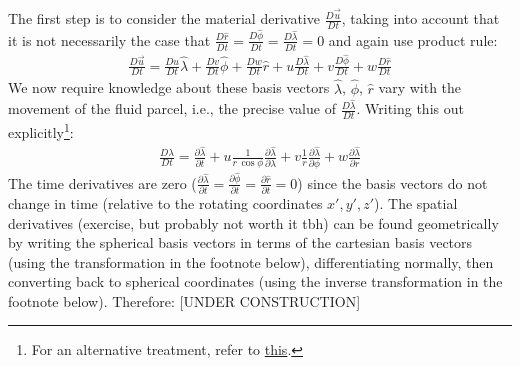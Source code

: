 The first step is to consider the material derivative \(\frac{D\vec{u}}{Dt}\), taking into account that it is not necessarily the case that \(\frac{D\hat{r}}{Dt}=\frac{D\hat{\phi}}{Dt}=\frac{D\hat{\lambda}}{Dt}=0\) and again use product rule:
\begin{align*}
    \frac{D\vec{u}}{Dt} = 
    \frac{Du}{Dt}\hat{\lambda} +
    \frac{Dv}{Dt}\hat{\phi} +
    \frac{Dw}{Dt}\hat{r} +
    u\frac{D\hat{\lambda}}{Dt} +
    v\frac{D\hat{\phi}}{Dt} +
    w\frac{D\hat{r}}{Dt}
\end{align*}
We now require knowledge about these basis vectors \(\hat{\lambda}\), \(\hat{\phi}\), \(\hat{r}\) vary with the movement of the fluid parcel, i.e., the precise value of \(\frac{D\hat{\lambda}}{Dt}\). Writing this out explicitly\footnote{For an alternative treatment, refer to \href{https://farside.ph.utexas.edu/teaching/336L/Fluidhtml/node258.html}{this}.}:
\begin{align*}
    \frac{D\hat{\lambda}}{Dt}
    =
    \frac{\partial \hat{\lambda}}{\partial t}
    +
    u\frac{1}{r\,\cos\phi}\frac{\partial \hat{\lambda}}{\partial \lambda}
    +
    v\frac{1}{r}\frac{\partial \hat{\lambda}}{\partial \phi}
    +
    w\frac{\partial \hat{\lambda}}{\partial r}
\end{align*}
The time derivatives are zero (\(\frac{\partial \hat{\lambda}}{\partial t}=\frac{\partial \hat{\phi}}{\partial t}=\frac{\partial \hat{r}}{\partial t}=0\)) since the basis vectors do not change in time (relative to the rotating coordinates \(x',y',z'\)). The spatial derivatives (exercise, but probably not worth it tbh) can be found geometrically by writing the spherical basis vectors in terms of the cartesian basis vectors (using the transformation in the footnote below), differentiating normally, then converting back to spherical coordinates (using the inverse transformation in the footnote below). Therefore: 
[UNDER CONSTRUCTION]

